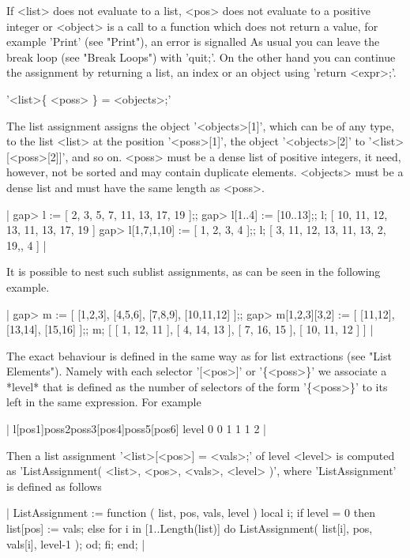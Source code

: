 If <list> does not evaluate  to a list,  <pos>  does  not evaluate  to  a
positive integer  or <object>  is  a  call to a  function which  does not
return a value, for example 'Print' (see "Print"), an error  is signalled
As usual you can  leave the  break loop (see "Break Loops") with 'quit;'.
On the other hand you can continue the assignment by returning a list, an
index or an object using 'return <expr>;'.

'<list>\{ <poss> \} \:= <objects>;'

The list assignment  assigns the object '<objects>[1]',  which  can be of
any  type,  to  the list <list>  at the position '<poss>[1]', the  object
'<objects>[2]' to '<list>[<poss>[2]]', and so on.  <poss> must be a dense
list  of  positive  integers, it need, however,  not  be  sorted and  may
contain duplicate elements.  <objects> must be a dense list and must have
the same length as <poss>.

|    gap> l := [ 2, 3, 5, 7, 11, 13, 17, 19 ];;
    gap> l{[1..4]} := [10..13];;  l;
    [ 10, 11, 12, 13, 11, 13, 17, 19 ]
    gap> l{[1,7,1,10]} := [ 1, 2, 3, 4 ];; l;
    [ 3, 11, 12, 13, 11, 13, 2, 19,, 4 ] |

It  is possible to nest  such sublist assignments, as can be seen  in the
following example.

|    gap> m := [ [1,2,3], [4,5,6], [7,8,9], [10,11,12] ];;
    gap> m{[1,2,3]}{[3,2]} := [ [11,12], [13,14], [15,16] ];;  m;
    [ [ 1, 12, 11 ], [ 4, 14, 13 ], [ 7, 16, 15 ], [ 10, 11, 12 ] ] |

The  exact behaviour  is defined in the  same way as for list extractions
(see   "List  Elements").   Namely   with  each   selector  '[<pos>]'  or
'\{<poss>\}'  we  associate a *level*  that is  defined as  the number of
selectors of the form '\{<poss>\}'  to its  left  in the same expression.
For example

|        l[pos1]{poss2}{poss3}[pos4]{poss5}[pos6]
    level   0      0      1     1      1     2   |

Then  a list assignment '<list>[<pos>]  \:=  <vals>;' of level <level> is
computed  as  'ListAssignment(  <list>, <pos>,  <vals>, <level> )', where
'ListAssignment' is defined as follows

|    ListAssignment := function ( list, pos, vals, level )
        local  i;
        if level = 0  then
            list[pos] := vals;
        else
            for i  in [1..Length(list)]  do
                ListAssignment( list[i], pos, vals[i], level-1 );
            od;
        fi;
    end; |

